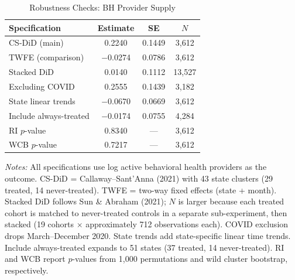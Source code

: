 \begin{table}[htbp]
\centering
\caption{Robustness Checks: BH Provider Supply}
\label{tab:robustness}
\begin{threeparttable}
\begin{tabular}{lccc}
\toprule
Specification & Estimate & SE & $N$ \\
\midrule
CS-DiD (main) & 0.2240 & 0.1449 & 3,612 \\
TWFE (comparison) & $-$0.0274 & 0.0786 & 3,612 \\
Stacked DiD & 0.0140 & 0.1112 & 13,527 \\
Excluding COVID & 0.2555 & 0.1439 & 3,182 \\
State linear trends & $-$0.0670 & 0.0669 & 3,612 \\
Include always-treated & $-$0.0174 & 0.0755 & 4,284 \\
RI $p$-value & 0.8340 & --- & 3,612 \\
WCB $p$-value & 0.7217 & --- & 3,612 \\
\bottomrule
\end{tabular}
\begin{tablenotes}[flushleft]
\small
\item \textit{Notes:} All specifications use log active behavioral health providers as the outcome. CS-DiD = Callaway--Sant'Anna (2021) with 43 state clusters (29 treated, 14 never-treated). TWFE = two-way fixed effects (state + month). Stacked DiD follows Sun \& Abraham (2021); $N$ is larger because each treated cohort is matched to never-treated controls in a separate sub-experiment, then stacked (19 cohorts $\times$ approximately 712 observations each). COVID exclusion drops March--December 2020. State trends add state-specific linear time trends. Include always-treated expands to 51 states (37 treated, 14 never-treated). RI and WCB report $p$-values from 1,000 permutations and wild cluster bootstrap, respectively.
\end{tablenotes}
\end{threeparttable}
\end{table}
